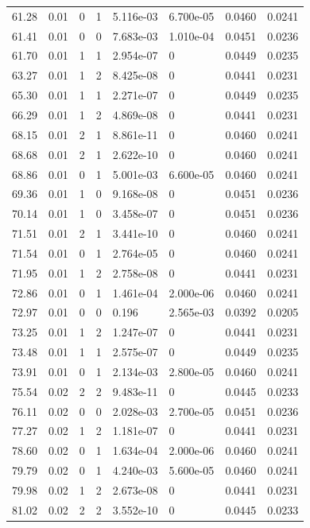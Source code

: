 \documentclass[preview]{standalone}
\begin{document}
{{{\begin{tabular}{L{1.2cm}C{1.2cm} C{0.3cm}C{0.5cm} C{1.4cm}C{1.4cm} C{1.4cm}C{1.4cm}}
  61.28  &  0.01  & 0     &  1 &  5.116e-03  & 6.700e-05  & 0.0460 &  0.0241   \\ 
  61.41  &  0.01  & 0     &  0 &  7.683e-03  & 1.010e-04  & 0.0451 &  0.0236   \\ 
  61.70  &  0.01  & 1     &  1 &  2.954e-07  & 0  & 0.0449 &  0.0235   \\ 
  63.27  &  0.01  & 1     &  2 &  8.425e-08  & 0  & 0.0441 &  0.0231   \\ 
  65.30  &  0.01  & 1     &  1 &  2.271e-07  & 0  & 0.0449 &  0.0235   \\ 
  66.29  &  0.01  & 1     &  2 &  4.869e-08  & 0  & 0.0441 &  0.0231   \\ 
  68.15  &  0.01  & 2     &  1 &  8.861e-11  & 0  & 0.0460 &  0.0241   \\ 
  68.68  &  0.01  & 2     &  1 &  2.622e-10  & 0  & 0.0460 &  0.0241   \\ 
  68.86  &  0.01  & 0     &  1 &  5.001e-03  & 6.600e-05  & 0.0460 &  0.0241   \\ 
  69.36  &  0.01  & 1     &  0 &  9.168e-08  & 0  & 0.0451 &  0.0236   \\ 
  70.14  &  0.01  & 1     &  0 &  3.458e-07  & 0  & 0.0451 &  0.0236   \\ 
  71.51  &  0.01  & 2     &  1 &  3.441e-10  & 0  & 0.0460 &  0.0241   \\ 
  71.54  &  0.01  & 0     &  1 &  2.764e-05  & 0  & 0.0460 &  0.0241   \\ 
  71.95  &  0.01  & 1     &  2 &  2.758e-08  & 0  & 0.0441 &  0.0231   \\ 
  72.86  &  0.01  & 0     &  1 &  1.461e-04  & 2.000e-06  & 0.0460 &  0.0241   \\ 
  72.97  &  0.01  & 0     &  0 &  0.196  & 2.565e-03  & 0.0392 &  0.0205   \\ 
  73.25  &  0.01  & 1     &  2 &  1.247e-07  & 0  & 0.0441 &  0.0231   \\ 
  73.48  &  0.01  & 1     &  1 &  2.575e-07  & 0  & 0.0449 &  0.0235   \\ 
  73.91  &  0.01  & 0     &  1 &  2.134e-03  & 2.800e-05  & 0.0460 &  0.0241   \\ 
  75.54  &  0.02  & 2     &  2 &  9.483e-11  & 0  & 0.0445 &  0.0233   \\ 
  76.11  &  0.02  & 0     &  0 &  2.028e-03  & 2.700e-05  & 0.0451 &  0.0236   \\ 
  77.27  &  0.02  & 1     &  2 &  1.181e-07  & 0  & 0.0441 &  0.0231   \\ 
  78.60  &  0.02  & 0     &  1 &  1.634e-04  & 2.000e-06  & 0.0460 &  0.0241   \\ 
  79.79  &  0.02  & 0     &  1 &  4.240e-03  & 5.600e-05  & 0.0460 &  0.0241   \\ 
  79.98  &  0.02  & 1     &  2 &  2.673e-08  & 0  & 0.0441 &  0.0231   \\ 
  81.02  &  0.02  & 2     &  2 &  3.552e-10  & 0  & 0.0445 &  0.0233   \\ 
\hline 
\end{tabular} 

}}}
\end{document}
